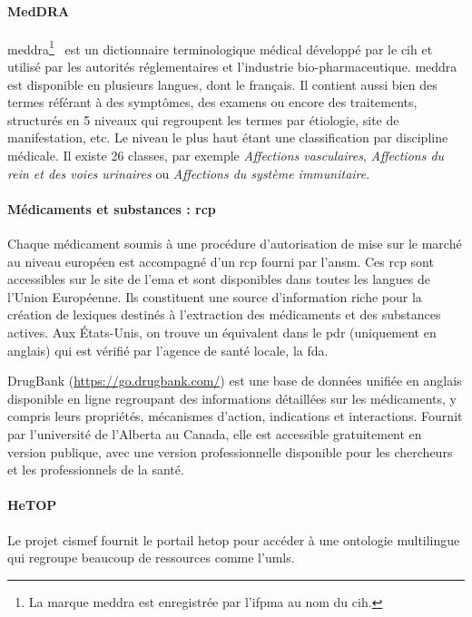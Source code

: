 \paragraph{MedDRA}
\gls{meddra}\footnote{La marque \gls{meddra} est enregistrée par l'\acs{ifpma} au nom du \acs{cih}.}~\cite{brownMedicalDictionaryRegulatory1999} est un dictionnaire terminologique médical développé par le \gls{cih} et utilisé par les autorités réglementaires et l'industrie bio-pharmaceutique.
\gls{meddra} est disponible en plusieurs langues, dont le français.
Il contient aussi bien des termes référant à des symptômes, des examens ou encore des traitements, structurés en 5 niveaux qui regroupent les termes par étiologie, site de manifestation, etc.
Le niveau le plus haut étant une classification par discipline médicale.
Il existe 26 classes, par exemple \textit{Affections vasculaires}, \textit{Affections du rein et des voies urinaires} ou \textit{Affections du système immunitaire}.

\paragraph{Médicaments et substances : \gls*{rcp}}
Chaque médicament soumis à une procédure d'autorisation de mise sur le marché au niveau européen est accompagné d'un \gls{rcp} fourni par l'\gls{ansm}.
Ces \gls{rcp} sont accessibles sur le site de l'\gls{ema} et sont disponibles dans toutes les langues de l'Union Européenne.
Ils constituent une source d'information riche pour la création de lexiques destinés à l'extraction des médicaments et des substances actives.
Aux États-Unis, on trouve un équivalent dans le \gls{pdr} (uniquement en anglais) qui est vérifié par l'agence de santé locale, la \gls{fda}.

DrugBank \cite{wishartDrugBankKnowledgebaseDrugs2008,wishartDrugBankMajorUpdate2018} (\url{https://go.drugbank.com/}) est une base de données unifiée en anglais disponible en ligne regroupant des informations détaillées sur les médicaments, y compris leurs propriétés, mécanismes d'action, indications et interactions.
Fournit par l'université de l'Alberta au Canada, elle est accessible gratuitement en version publique, avec une version professionnelle disponible pour les chercheurs et les professionnels de la santé.

\paragraph{HeTOP}
Le projet \gls{cismef} fournit le portail \gls{hetop} pour accéder à une ontologie multilingue qui regroupe beaucoup de ressources comme l'\gls{umls}.

